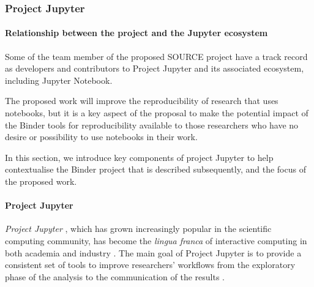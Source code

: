 \subsubsection{Project Jupyter}
\label{sec:project-jupyter}


\paragraph{Relationship between the \TheProject{} project and the Jupyter ecosystem}

Some of the team member of the proposed SOURCE project have a track record as
developers and contributors to Project Jupyter and its associated
ecosystem, including Jupyter Notebook.

The proposed work will improve the reproducibility of research that uses
notebooks, but it is a key aspect of the proposal to make the potential
impact of the Binder tools for reproducibility available to those researchers
who have no desire or possibility to use notebooks in their work.

In this section, we introduce key components of project Jupyter to help
contextualise the Binder project that is described subsequently, and the focus
of the proposed work.




\paragraph{Project Jupyter}

\emph{Project Jupyter} \cite{Jupyter}, which has grown increasingly popular in the scientific
computing community, has become the \emph{lingua franca} of interactive
computing in both academia and industry \cite{Perkel2018}. The main goal of Project Jupyter
is to provide a consistent set of tools to improve researchers'
workflows from the exploratory phase of the analysis to the communication
of the results \cite{Kluyver2016,Granger2021}.

